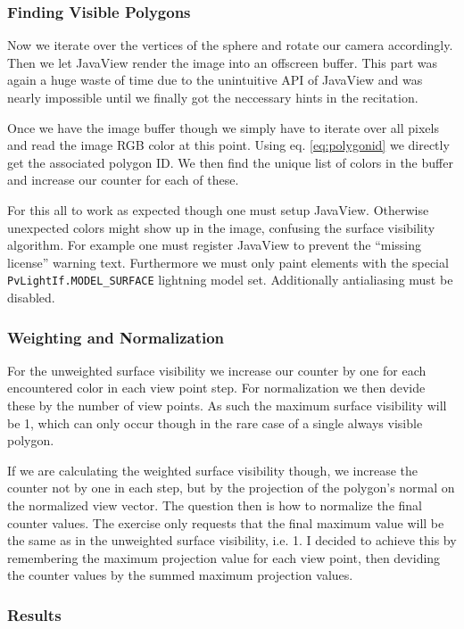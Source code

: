 \documentclass[a4paper,10pt,notitlepage]{scrreprt}
\begin{document}
\subsubsection{Finding Visible Polygons}

Now we iterate over the vertices of the sphere and rotate our camera
accordingly. Then we let JavaView render the image into an offscreen buffer.
This part was again a huge waste of time due to the unintuitive API of JavaView
and was nearly impossible until we finally got the neccessary hints in the
recitation.

Once we have the image buffer though we simply have to iterate over all pixels
and read the image RGB color at this point. Using eq. \ref{eq:polygonid} we
directly get the associated polygon ID. We then find the unique list of colors
in the buffer and increase our counter for each of these.

For this all to work as expected though one must setup JavaView. Otherwise
unexpected colors might show up in the image, confusing the surface visibility
algorithm. For example one must register JavaView to prevent the ``missing
license'' warning text. Furthermore we must only paint elements with the special
\texttt{PvLightIf.MODEL\_SURFACE} lightning model set. Additionally antialiasing
must be disabled.

\subsubsection{Weighting and Normalization}

For the unweighted surface visibility we increase our counter by one for each
encountered color in each view point step. For normalization we then devide
these by the number of view points. As such the maximum surface visibility will
be 1, which can only occur though in the rare case of a single always
visible polygon.

If we are calculating the weighted surface visibility though, we increase the
counter not by one in each step, but by the projection of the polygon's normal
on the normalized view vector. The question then is how to normalize the final
counter values. The exercise only requests that the final maximum value will be
the same as in the unweighted surface visibility, i.e. 1. I decided to achieve
this by remembering the maximum projection value for each view point, then
deviding the counter values by the summed maximum projection values.

\subsubsection{Results}
\end{document}
